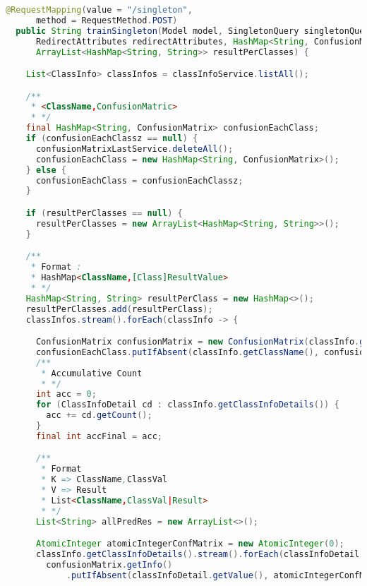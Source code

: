 \begin{lstlisting}[language=Java,basicstyle=\tiny,caption=TestingController.java]
  @RequestMapping(value = "/singleton",
      method = RequestMethod.POST)
  public String trainSingleton(Model model, SingletonQuery singletonQuery,
      RedirectAttributes redirectAttributes, HashMap<String, ConfusionMatrix> confusionEachClassz,
      ArrayList<HashMap<String, String>> resultPerClasses) {

    List<ClassInfo> classInfos = classInfoService.listAll();

    /**
     * <ClassName,ConfusionMatric>
     * */
    final HashMap<String, ConfusionMatrix> confusionEachClass;
    if (confusionEachClassz == null) {
      confusionMatrixLastService.deleteAll();
      confusionEachClass = new HashMap<String, ConfusionMatrix>();
    } else {
      confusionEachClass = confusionEachClassz;
    }

    if (resultPerClasses == null) {
      resultPerClasses = new ArrayList<HashMap<String, String>>();
    }

    /**
     * Format :
     * HashMap<ClassName,[Class]ResultValue>
     * */
    HashMap<String, String> resultPerClass = new HashMap<>();
    resultPerClasses.add(resultPerClass);
    classInfos.stream().forEach(classInfo -> {

      ConfusionMatrix confusionMatrix = new ConfusionMatrix(classInfo.getClassInfoDetails().size());
      confusionEachClass.putIfAbsent(classInfo.getClassName(), confusionMatrix);
      /**
       * Accumulative Count
       * */
      int acc = 0;
      for (ClassInfoDetail cd : classInfo.getClassInfoDetails()) {
        acc += cd.getCount();
      }
      final int accFinal = acc;

      /**
       * Format
       * K => ClassName,ClassVal
       * V => Result
       * List<ClassName,ClassVal|Result>
       * */
      List<String> allPredRes = new ArrayList<>();

      AtomicInteger atomicIntegerConfMatrix = new AtomicInteger(0);
      classInfo.getClassInfoDetails().stream().forEach(classInfoDetail -> {
        confusionMatrix.getInfo()
            .putIfAbsent(classInfoDetail.getValue(), atomicIntegerConfMatrix.getAndIncrement());


\end{lstlisting}
